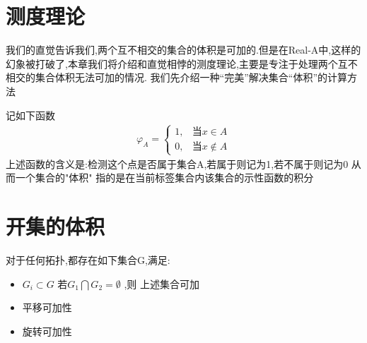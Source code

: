 \section{测度理论}
我们的直觉告诉我们,两个互不相交的集合的体积是可加的.但是在Real-A中,这样的幻象被打破了,本章我们将介绍和直觉相悖的测度理论,主要是专注于处理两个互不相交的集合体积无法可加的情况.
我们先介绍一种“完美”解决集合“体积”的计算方法
\begin{Theorem}[示性函数]
  记如下函数 \begin{align}
    \varphi_{A} = \begin{cases}
      1, &\text{当} x \in A \\
      0, &\text{当} x \notin A 
    \end{cases}
  \end{align} 
  上述函数的含义是:检测这个点是否属于集合A,若属于则记为1,若不属于则记为0 从而一个集合的"体积"
  指的是在当前标签集合内该集合的示性函数的积分
\end{Theorem}
\section{开集的体积}
\begin{Theorem}
  对于任何拓扑,都存在如下集合G,满足:
  \begin{itemize}
    \item \(G_i \subset G \) 若\(G_1 \bigcap G_2 =\emptyset \) ,则 上述集合可加 \\
    \item 平移可加性 \\
    \item 旋转可加性
  \end{itemize}
\end{Theorem}
